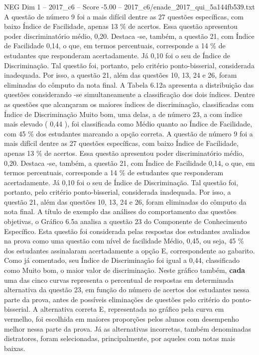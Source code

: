 \begin{textsample}{NEG Dim 1 – 2017\_c6 – Score -5.00 – 2017\_c6/enade\_2017\_qui\_5a144fb539.txt}
A questão de número 9 foi a mais difícil dentre as 27 questões específicas, com baixo Índice de Facilidade, apenas 13 \% de acertos.
Essa questão apresentou poder discriminatório médio, 0,20.
Destaca -se, também, a questão 21, com Índice de Facilidade 0,14, o que, em termos percentuais, corresponde a 14 \% de estudantes que responderam acertadamente.
Já 0,10 foi o seu de Índice de Discriminação.
Tal questão foi, portanto, pelo critério ponto-bisserial, considerada inadequada.
Por isso, a questão 21, além das questões 10, 13, 24 e 26, foram eliminadas do cômputo da nota final.
A Tabela 6.12a apresenta a distribuição das questões considerando -se simultaneamente a classificação dos dois índices.
Dentre as questões que alcançaram os maiores índices de discriminação, classificadas com Índice de Discriminação Muito bom, uma delas, a de número 23, a com índice mais elevado ( 0,44 ), foi classificada como Médio quanto ao Índice de Facilidade, com 45 \% dos estudantes marcando a opção correta.
A questão de número 9 foi a mais difícil dentre as 27 questões específicas, com baixo Índice de Facilidade, apenas 13 \% de acertos.
Essa questão apresentou poder discriminatório médio, 0,20.
Destaca -se, também, a questão 21, com Índice de Facilidade 0,14, o que, em termos percentuais, corresponde a 14 \% de estudantes que responderam acertadamente.
Já 0,10 foi o seu de Índice de Discriminação.
Tal questão foi, portanto, pelo critério ponto-bisserial, considerada inadequada.
Por isso, a questão 21, além das questões 10, 13, 24 e 26, foram eliminadas do cômputo da nota final.
A título de exemplo das análises do comportamento das questões objetivas, o Gráfico 6.5a analisa a questão 23 do Componente de Conhecimento Específico.
Esta questão foi considerada pelas respostas dos estudantes avaliados na prova como uma questão com nível de facilidade Médio, 0,45, ou seja, 45 \% dos estudantes assinalaram acertadamente a opção E, correspondente ao gabarito.
Como já comentado, seu Índice de Discriminação foi igual a 0,44, classificado como Muito bom, o maior valor de discriminação.
Neste gráfico também, \textbf{cada} uma das cinco curvas representa o percentual de respostas em determinada alternativa da questão 23, em função do número de acertos dos estudantes nessa parte da prova, antes de possíveis eliminações de questões pelo critério do ponto-bisserial.
A alternativa correta E, representada no gráfico pela curva em vermelho, foi escolhida em maiores proporções pelos alunos com desempenho melhor nessa parte da prova.
Já as alternativas incorretas, também denominadas distratores, foram selecionadas, principalmente, por aqueles com notas mais baixas.

\end{textsample}
